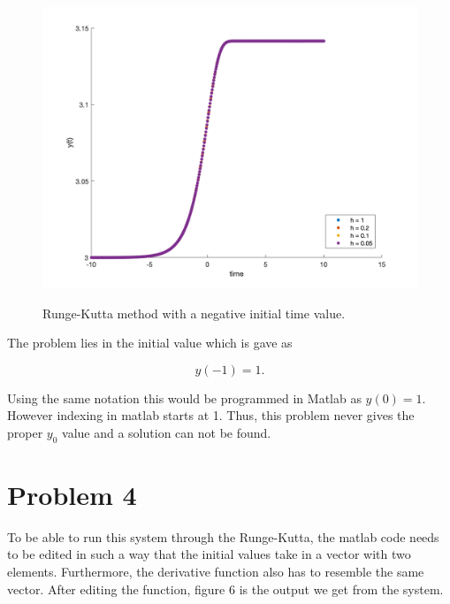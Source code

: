 \documentclass[12pt]{article}
\begin{document}
\begin{figure}[h!]
    \centering
    {{\includegraphics[width=15cm]{rk_neg_t.png}}}%
    \qquad
    \caption{Runge-Kutta method with a negative initial time value.}%
    \label{fig:example}%
\end{figure}

\newpage

The problem lies in the initial value which is gave as 

$$
y(-1) = 1.
$$

Using the same notation this would be programmed in Matlab as $y(0) =  1$. However indexing in matlab starts at 1. Thus, this problem never gives the proper $y_{0}$ value and a solution can not be found.

\newpage

\section*{Problem 4}

To be able to run this system through the Runge-Kutta, the matlab code needs to be edited in such a way that the initial values take in a vector with two elements. Furthermore, the derivative function also has to resemble the same vector. After editing the function, figure 6 is the output we get from the system.
\end{document}
